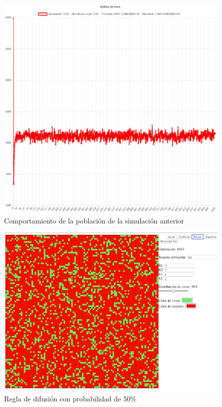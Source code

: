 	\begin{figure}[H]
		\begin{center}
			\includegraphics[scale=.24]{GOL/img/dif40-2.png}
			\caption{Comportamiento de la población de la simulación anterior}
			\label{fig:gol5}
		\end{center}
	\end{figure}

	\begin{figure}[H]
		\begin{center}
			\includegraphics[scale=.3]{GOL/img/dif50-1.png}
			\caption{Regla de difusión con probabilidad de 50\%}
			\label{fig:gol5}
		\end{center}
	\end{figure}

